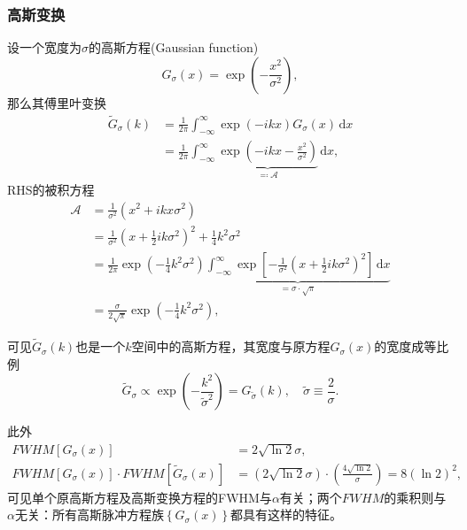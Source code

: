 \subsubsection{高斯变换}
\label{sec:fourier-gaussian}
设一个宽度为$\sigma$的高斯方程(Gaussian function)
\begin{equation*}
  G_{\sigma}(x) = \exp \left( - \frac{x^{2}}{\sigma^{2}}\right),
\end{equation*}
那么其傅里叶变换
\begin{equation*}
  \begin{split}
    \widetilde{G}_{\sigma} \left( k \right)
    & = \frac{1}{2 \pi}
    \int_{-\infty}^{\infty} \exp \left( - i k x \right)
    G_{\sigma} \left( x \right) \, \mathrm{d} x \\
    & = \frac{1}{2 \pi}
    \int_{-\infty}^{\infty}
    \underbrace{
    \exp
    \left(
    - i k x - \frac{x^{2}}{\sigma^{2}}
    \right)
    }_{\eqqcolon \mathcal{A} }
    \, \mathrm{d} x,
  \end{split}
\end{equation*}
RHS的被积方程
\begin{equation*}
  \begin{split}
    \mathcal{A} & = \frac{1}{\sigma^{2}}
    \left( x^{2} + i k x \sigma^{2} \right) \\
    & = \frac{1}{\sigma^{2}}
    \left(
    x + \frac{1}{2} i k \sigma^{2}
    \right)^{2} + \frac{1}{4} k^{2} \sigma^{2} \\
    & = \frac{1}{2 \pi} \exp \left( - \frac{1}{4} k^{2} \sigma^{2} \right)
    \underbrace{
    \int_{-\infty}^{\infty} \exp
    \left[
    - \frac{1}{\sigma^{2}}
    \left( x + \frac{1}{2} i k \sigma^{2} \right)^{2}
    \right] \, \mathrm{d} x
    }_{= \sigma \cdot \sqrt{\pi}} \\
    & = \frac{\sigma}{2 \sqrt{\pi}} \exp \left( - \frac{1} {4} k^{2} \sigma^{2} \right),
  \end{split}
\end{equation*}

可见$\widetilde{G}_{\sigma}(k)$也是一个$k$空间中的高斯方程，其宽度与原方程$G_{\sigma}(x)$的宽度成等比例
\begin{equation*}
  \widetilde{G}_{\sigma} \propto \exp \left( - \frac{k^{2}}{\tilde{\sigma}^{2}} \right) = G_{\tilde{\sigma}} \left( k \right), \quad \tilde{\sigma} \equiv \frac{2}{\sigma}.
\end{equation*}

此外
\begin{equation}
    \label{eq:fourier-gaussian-fwhm-product}
  \begin{split}
    FWHM \left[ G_{\sigma} \left( x \right) \right]
    & = 2 \sqrt{ \ln 2} \sigma, \\
    FWHM \left[ G_{\sigma} \left( x \right) \right] \cdot FWHM \left[ \widetilde{G}_{\sigma} \left( x \right) \right]
    & = \left( 2 \sqrt{\ln 2} \sigma \right) \cdot
    \left( \frac{4 \sqrt{\ln 2}}{\sigma}\right) = 8 \left( \ln 2\right)^{2},
  \end{split}
\end{equation}
可见单个原高斯方程及高斯变换方程的FWHM与$\alpha$有关；两个$FWHM$的乘积则与$\alpha$无关：所有高斯脉冲方程族$\left\{ G_{\sigma}(x) \right\}$都具有这样的特征。

